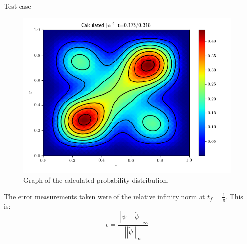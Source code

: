 \documentclass[final]{beamer}
\newlength{\onecolwid}
\newlength{\twocolwid}
\begin{document}
\begin{frame}[t]
\begin{columns}[t]
\begin{column}{\twocolwid}
\begin{columns}[t,totalwidth=\twocolwid]
\begin{column}{\onecolwid}
\begin{block}{Test case}
\begin{figure}[H]
\includegraphics[width=\linewidth]{toy_sol.png}
\caption{Graph of the calculated probability distribution.}
\end{figure}

The error measurements taken were of the relative infinity norm at $t_f=\frac{1}{\pi}$. This is:
\begin{equation}
\epsilon=\frac{\left|\left|\psi-\tilde{\psi}\right|\right|_{\infty}}{\left|\left|\tilde{\psi}\right|\right|_{\infty}}
\end{equation}


\end{block}
\end{column}
\end{columns}
\end{column}
\end{columns}
\end{frame}
\end{document}

